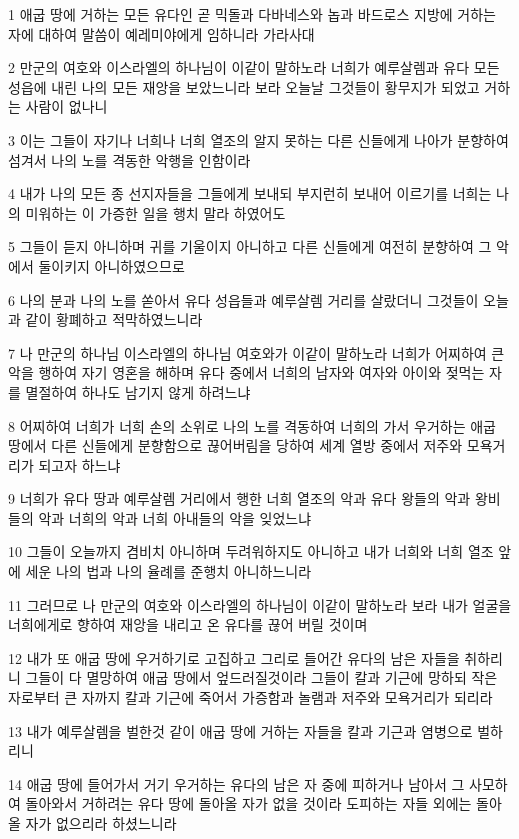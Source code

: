 \par 1 애굽 땅에 거하는 모든 유다인 곧 믹돌과 다바네스와 놉과 바드로스 지방에 거하는 자에 대하여 말씀이 예레미야에게 임하니라 가라사대
\par 2 만군의 여호와 이스라엘의 하나님이 이같이 말하노라 너희가 예루살렘과 유다 모든 성읍에 내린 나의 모든 재앙을 보았느니라 보라 오늘날 그것들이 황무지가 되었고 거하는 사람이 없나니
\par 3 이는 그들이 자기나 너희나 너희 열조의 알지 못하는 다른 신들에게 나아가 분향하여 섬겨서 나의 노를 격동한 악행을 인함이라
\par 4 내가 나의 모든 종 선지자들을 그들에게 보내되 부지런히 보내어 이르기를 너희는 나의 미워하는 이 가증한 일을 행치 말라 하였어도
\par 5 그들이 듣지 아니하며 귀를 기울이지 아니하고 다른 신들에게 여전히 분향하여 그 악에서 둘이키지 아니하였으므로
\par 6 나의 분과 나의 노를 쏟아서 유다 성읍들과 예루살렘 거리를 살랐더니 그것들이 오늘과 같이 황폐하고 적막하였느니라
\par 7 나 만군의 하나님 이스라엘의 하나님 여호와가 이같이 말하노라 너희가 어찌하여 큰 악을 행하여 자기 영혼을 해하며 유다 중에서 너희의 남자와 여자와 아이와 젖먹는 자를 멸절하여 하나도 남기지 않게 하려느냐
\par 8 어찌하여 너희가 너희 손의 소위로 나의 노를 격동하여 너희의 가서 우거하는 애굽 땅에서 다른 신들에게 분향함으로 끊어버림을 당하여 세계 열방 중에서 저주와 모욕거리가 되고자 하느냐
\par 9 너희가 유다 땅과 예루살렘 거리에서 행한 너희 열조의 악과 유다 왕들의 악과 왕비들의 악과 너희의 악과 너희 아내들의 악을 잊었느냐
\par 10 그들이 오늘까지 겸비치 아니하며 두려워하지도 아니하고 내가 너희와 너희 열조 앞에 세운 나의 법과 나의 율례를 준행치 아니하느니라
\par 11 그러므로 나 만군의 여호와 이스라엘의 하나님이 이같이 말하노라 보라 내가 얼굴을 너희에게로 향하여 재앙을 내리고 온 유다를 끊어 버릴 것이며
\par 12 내가 또 애굽 땅에 우거하기로 고집하고 그리로 들어간 유다의 남은 자들을 취하리니 그들이 다 멸망하여 애굽 땅에서 엎드러질것이라 그들이 칼과 기근에 망하되 작은 자로부터 큰 자까지 칼과 기근에 죽어서 가증함과 놀램과 저주와 모욕거리가 되리라
\par 13 내가 예루살렘을 벌한것 같이 애굽 땅에 거하는 자들을 칼과 기근과 염병으로 벌하리니
\par 14 애굽 땅에 들어가서 거기 우거하는 유다의 남은 자 중에 피하거나 남아서 그 사모하여 돌아와서 거하려는 유다 땅에 돌아올 자가 없을 것이라 도피하는 자들 외에는 돌아올 자가 없으리라 하셨느니라
